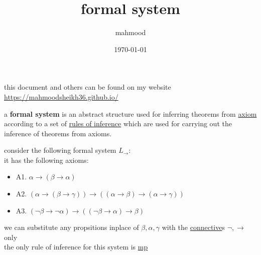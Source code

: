 \documentclass[a4paper,12pt]{article}
\author{mahmood}
\date{\today}
\title{formal system}
\begin{document}
\maketitle
\begin{note}
this document and others can be found on my website\\
\url{https://mahmoodsheikh36.github.io/}
\end{note}
\begin{definition}
a \textbf{formal system} is an abstract structure used for inferring theorems from \href{20230525165114-axiom.org}{axiom} according to a set of \href{20230524202636-rule_of_inference.org}{rules of inference} which are used for carrying out the inference of theorems from axioms.\\[0pt]
\end{definition}
\begin{my_example}
consider the following formal system \(L_\to\):\\[0pt]
it has the following axioms:\\[0pt]
\begin{itemize}
\item A1. \(\alpha \to (\beta \to \alpha)\)\\[0pt]
\item A2. \((\alpha \to (\beta \to \gamma)) \to ((\alpha \to \beta) \to (\alpha \to \gamma))\)\\[0pt]
\item A3. \((\lnot \beta \to \lnot \alpha) \to ((\lnot \beta \to \alpha) \to \beta)\)\\[0pt]
\end{itemize}
we can substitute any propsitions inplace of \(\beta,\alpha,\gamma\) with the \href{20230401203310-logical_connective.org}{connective}s \(\lnot, \to\) only\\[0pt]
the only rule of inference for this system is \href{20230524210722-modus_ponens.org}{mp}\\[0pt]
\end{my_example}
\end{document}
